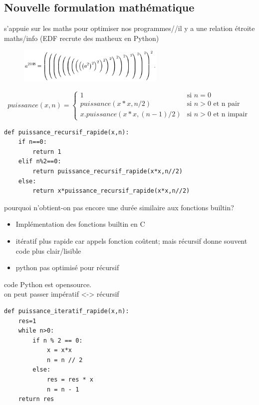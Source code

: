 \documentclass[a4paper,11pt]{article}
\begin{document}
\begin{Form}
\subsection{Nouvelle formulation mathématique}
\begin{commentprof}
s'appuie sur les maths pour optimiser nos programmes//il y a une relation étroite maths/info (EDF recrute des matheux en Python)
\end{commentprof}
\begin{figure}[!h]
\centering
\includegraphics[width=7cm]{ressources/exponentiationrapide.png}
\label{exponentiation}
\end{figure}
$$
puissance(x,n) = \left\{
    \begin{array}{ll}
        1 & \mbox{si } n=0 \\
        puissance(x*x,n/2) & \mbox{si } n>0 \mbox{ et n pair}\\
        x.puissance(x*x,(n-1)/2) & \mbox{si } n>0 \mbox{ et n impair}\
    \end{array}
\right.
$$
\begin{lstlisting}
def puissance_recursif_rapide(x,n):
    if n==0:
        return 1
    elif n%2==0:
        return puissance_recursif_rapide(x*x,n//2)
    else:
        return x*puissance_recursif_rapide(x*x,n//2)
\end{lstlisting}
\begin{commentprof}
pourquoi n'obtient-on pas encore une durée similaire aux fonctions builtin? 
\begin{itemize}
\item Implémentation des fonctions builtin en C
\item itératif plus rapide car appels fonction coûtent; mais récursif donne souvent code plus clair/lisible
\item python pas optimisé pour récursif
\end{itemize}
code Python est opensource.\\on peut passer impératif <-> récursif
\end{commentprof}
\begin{lstlisting}
def puissance_iteratif_rapide(x,n):
    res=1
    while n>0:
        if n % 2 == 0:
            x = x*x
            n = n // 2
        else:
            res = res * x
            n = n - 1
    return res
\end{lstlisting}
\end{Form}
\end{document}
